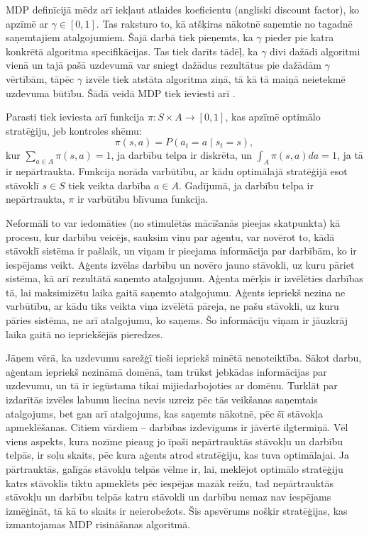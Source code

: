 \documentclass{ludis} %
\begin{document}
MDP definīcijā mēdz arī iekļaut atlaides koeficientu (angliski discount factor), ko apzīmē ar $\gamma \in [0,1]$.
Tas raksturo to, kā atšķiras nākotnē saņemtie no tagadnē saņemtajiem atalgojumiem.
Šajā darbā tiek pieņemts, ka $\gamma$ pieder pie katra konkrētā algoritma specifikācijas. %
Tas tiek darīts tādēļ, ka $\gamma$ divi dažādi algoritmi vienā un tajā pašā uzdevumā var sniegt dažādus rezultātus pie dažādām $\gamma$ vērtībām, %
tāpēc $\gamma$ izvēle tiek atstāta algoritma ziņā, tā kā tā maiņā neietekmē uzdevuma būtību. %
Šādā veidā MDP tiek ieviesti arī \autocite{Otterlo}.

Parasti tiek ieviesta arī funkcija $\pi: S \times A \rightarrow [0, 1]$, kas apzīmē optimālo stratēģiju, jeb kontroles shēmu:
\[
	\pi(s, a) = P(a_t = a \mid s_t = s),
\]
kur $\sum_{a\in A} \pi(s,a)=1$, ja darbību telpa ir diskrēta, un $\int_{A} \pi(s,a) da = 1$, ja tā ir nepārtraukta. Funkcija norāda varbūtību, ar kādu optimālajā stratēģijā esot stāvoklī $s \in S$ tiek veikta darbība $a \in A$. Gadījumā, ja darbību telpa ir nepārtraukta, $\pi$ ir varbūtību blīvuma funkcija.

Neformāli to var iedomāties (no stimulētās mācīšanās pieejas skatpunkta) kā procesu, kur darbību veicējs, sauksim viņu par aģentu, var novērot to, kādā 
stāvoklī sistēma ir pašlaik, un viņam ir pieejama informācija par darbībām, ko ir iespējams veikt.
Aģents izvēlas darbību un novēro jauno stāvokli, uz kuru pāriet sistēma, kā arī rezultātā saņemto atalgojumu.
Aģenta mērķis ir izvēlēties darbības tā, lai maksimizētu laika gaitā saņemto atalgojumu.
Aģents iepriekš nezina ne varbūtību, ar kādu tiks veikta viņa izvēlētā pāreja, ne pašu stāvokli, uz kuru pāries sistēma, ne arī atalgojumu, ko saņems.
Šo informāciju viņam ir jāuzkrāj laika gaitā no iepriekšējās pieredzes.

Jāņem vērā, ka uzdevumu sarežģī tieši iepriekš minētā nenoteiktība.
Sākot darbu, aģentam iepriekš nezināmā domēnā, tam trūkst jebkādas informācijas par uzdevumu, un tā ir iegūstama tikai mijiedarbojoties ar domēnu.
Turklāt par izdarītās izvēles labumu liecina nevis uzreiz pēc tās veikšanas saņemtais atalgojums, bet gan arī atalgojums, kas saņemts nākotnē, pēc šī stāvokļa apmeklēšanas.
Citiem vārdiem -- darbības izdevīgums ir jāvērtē ilgtermiņā.
Vēl viens aspekts, kura nozīme pieaug jo īpaši nepārtrauktās stāvokļu un darbību telpās, ir soļu skaits, pēc kura aģents atrod stratēģiju, kas tuva optimālajai.
Ja pārtrauktās, galīgās stāvokļu telpās vēlme ir, lai, meklējot optimālo stratēģiju katrs stāvoklis tiktu apmeklēts pēc iespējas mazāk reižu, tad nepārtrauktās stāvokļu un darbību telpās katru stāvokli un darbību nemaz nav iespējams izmēģināt, tā kā to skaits ir neierobežots.
Šis apsvērums nošķir stratēģijas, kas izmantojamas MDP risināšanas algoritmā. %
\end{document}
